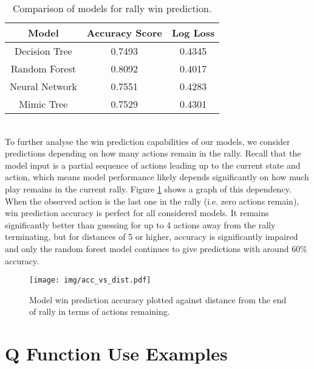 \documentclass{sfuthesis}
\begin{document}
	\begin{table}
		\centering
		\begin{tabular}{c|cc}
			\textbf{Model} & \textbf{Accuracy Score} & \textbf{Log Loss} \\ \hline
			Decision Tree  & 0.7493                  & 0.4345            \\
			Random Forest  & 0.8092                  & 0.4017            \\
			Neural Network & 0.7551                  & 0.4283            \\
			Mimic Tree     & 0.7529                  & 0.4301           
		\end{tabular}
		\caption{Comparison of models for rally win prediction.}
		\label{tab:class_accuracy}
	\end{table}
	\\To further analyse the win prediction capabilities of our models, we consider predictions depending on how many actions remain in the rally. Recall that the model input is a partial sequence of actions leading up to the current state and action, which means model performance likely depends significantly on how much play remains in the current rally. Figure \ref{fig:acc-vs-dist} shows a graph of this dependency. When the observed action is the last one in the rally (i.e. zero actions remain), win prediction accuracy is perfect for all considered models. It remains significantly better than guessing for up to 4 actions away from the rally terminating, but for distances of 5 or higher, accuracy is significantly impaired and only the random forest model continues to give predictions with around 60\% accuracy.
	\begin{figure}
		\texttt{[image: img/acc\_vs\_dist.pdf]}
		\caption{Model win prediction accuracy plotted against distance from the end of rally in terms of actions remaining.}
		\label{fig:acc-vs-dist}
	\end{figure}
	
	\chapter{Q Function Use Examples}
\end{document}

